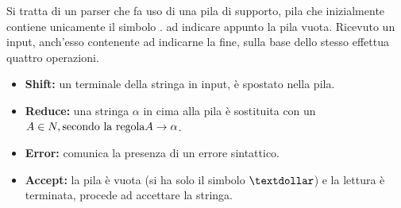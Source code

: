 \documentclass{subfiles}
\begin{document}
Si tratta di un parser che fa uso di una pila di supporto, pila che inizialmente contiene unicamente il simbolo \textdollar.
ad indicare appunto la pila vuota. Ricevuto un input, anch'esso contenente \textdollar ad indicarne la fine,
sulla base dello stesso effettua quattro operazioni.
\begin{itemize}
    \item \textbf{Shift:} un terminale della stringa in input, è spostato nella pila.
    \item \textbf{Reduce:} una stringa \(\alpha\) in cima alla pila è sostituita con un \(A \in N, \text{secondo la regola} \Grammar{A}{\alpha}\).
    \item \textbf{Error:} comunica la presenza di un errore sintattico.
    \item \textbf{Accept:} la pila è vuota (si ha solo il simbolo \(\textdollar\)) e la lettura è terminata,
          procede ad accettare la stringa.
\end{itemize}
\end{document}
